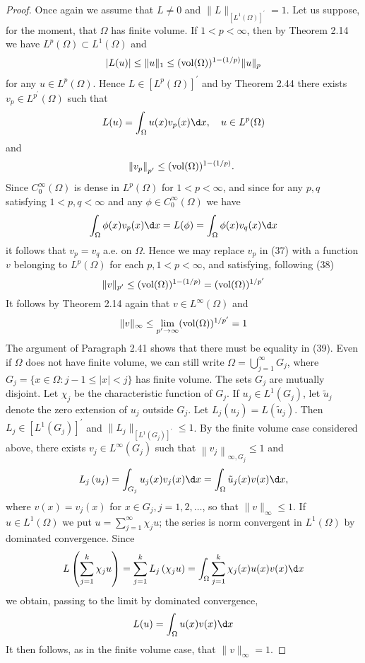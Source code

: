 \begin{proof}
  Once again we assume that $L \neq 0$ and $\|L\|_{\left[L^1(\Omega)\right]^{\prime}}=1$. Let us suppose, for the moment, that $\Omega$ has finite volume. If $1<p<\infty$, then by Theorem 2.14 we have $L^p(\Omega) \subset L^1(\Omega)$ and
  \[
  |L(u)| \leq\|u\|_1 \leq(\operatorname{vol}(\Omega))^{1-(1 / p)}\|u\|_p
  \]
  for any $u \in L^p(\Omega)$. Hence $L \in\left[L^p(\Omega)\right]^{\prime}$ and by Theorem 2.44 there exists $v_p \in L^{p^{\prime}}(\Omega)$ such that
  \[
  L(u)=\int_{\Omega} u(x) v_p(x) \d x, \quad u \in L^p(\Omega)
  \]
  and
  \[
  \left\|v_p\right\|_{p^{\prime}} \leq(\operatorname{vol}(\Omega))^{1-(1 / p)} \text {. }
  \]
  Since $C_0^{\infty}(\Omega)$ is dense in $L^p(\Omega)$ for $1<p<\infty$, and since for any $p, q$ satisfying $1<p, q<\infty$ and any $\phi \in C_0^{\infty}(\Omega)$ we have
  \[
  \int_{\Omega} \phi(x) v_p(x) \d x=L(\phi)=\int_{\Omega} \phi(x) v_q(x) \d x
  \]
  it follows that $v_p=v_q$ a.e. on $\Omega$. Hence we may replace $v_p$ in (37) with a function $v$ belonging to $L^p(\Omega)$ for each $p, 1<p<\infty$, and satisfying, following (38)
  \[
  \|v\|_{p^{\prime}} \leq(\operatorname{vol}(\Omega))^{1-(1 / p)}=(\operatorname{vol}(\Omega))^{1 / p^{\prime}}
  \]
  It follows by Theorem 2.14 again that $v \in L^{\infty}(\Omega)$ and
  \[
  \|v\|_{\infty} \leq \lim _{p^{\prime} \rightarrow \infty}(\operatorname{vol}(\Omega))^{1 / p^{\prime}}=1
  \]
  The argument of Paragraph 2.41 shows that there must be equality in (39).
  Even if $\Omega$ does not have finite volume, we can still write $\Omega=\bigcup_{j=1}^{\infty} G_j$, where $G_j=\{x \in \Omega: j-1 \leq|x|<j\}$ has finite volume. The sets $G_j$ are mutually disjoint. Let $\chi_j$ be the characteristic function of $G_j$. If $u_j \in L^1\left(G_j\right)$, let $\tilde{u}_j$ denote the zero extension of $u_j$ outside $G_j$. Let $L_j\left(u_j\right)=L\left(\tilde{u}_j\right)$. Then $L_j \in\left[L^1\left(G_j\right)\right]^{\prime}$ and $\|L_j\|_{\left[L^1\left(G_j\right)\right]^{\prime}} \leq 1$. By the finite volume case considered above, there exists $v_j \in L^{\infty}\left(G_j\right)$ such that $\left\|v_j\right\|_{\infty, G_j} \leq 1$ and
  \[
  L_j\left(u_j\right)=\int_{G_j} u_j(x) v_j(x) \d x=\int_{\Omega} \tilde{u}_j(x) v(x) \d x,
  \]
  where $v(x)=v_j(x)$ for $x \in G_j, j=1,2, \ldots$, so that $\|v\|_{\infty} \leq 1$. If $u \in L^1(\Omega)$ we put $u=\sum_{j=1}^{\infty} \chi_j u$; the series is norm convergent in $L^1(\Omega)$ by dominated convergence. Since
  \[
  L\left(\sum_{j=1}^k \chi_j u\right)=\sum_{j=1}^k L_j\left(\chi_j u\right)=\int_{\Omega} \sum_{j=1}^k \chi_j(x) u(x) v(x) \d x
  \]
  we obtain, passing to the limit by dominated convergence,
  \[
  L(u)=\int_{\Omega} u(x) v(x) \d x
  \]
  It then follows, as in the finite volume case, that $\|v\|_{\infty}=1$.
\end{proof}


